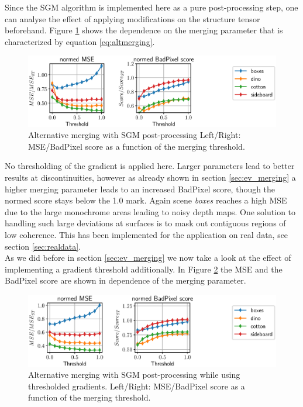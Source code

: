 \documentclass  [
  paper    = a4,
  BCOR     = 10mm,
  twoside,
  fontsize = 12pt,
  fleqn,
  toc      = bibnumbered,
  toc      = listofnumbered,
  numbers  = noendperiod,
  headings = normal,
  listof   = leveldown,
  version  = 3.03
]                                       {scrreprt}
\begin{document}
Since the SGM algorithm is implemented here as a pure post-processing step, one can analyse the effect of applying modifications on the structure tensor beforehand. Figure \ref{fig:chooselowersgmppr} shows the dependence on the merging parameter that is characterized by equation \ref{eq:altmerging}. 
\begin{figure}[h!]
	\centering
	\includegraphics[width=1\linewidth]{images/choose_lower_sgm_ppr}
	\caption[Alternative merging with SGM post-processing]{Alternative merging with SGM post-processing Left/Right: MSE/BadPixel score as a function of the merging threshold.}
	\label{fig:chooselowersgmppr}
\end{figure}
No thresholding of the gradient is applied here. Larger parameters lead to better results at discontinuities, however as already shown in section \ref{sec:ev_merging} a higher merging parameter leads to an increased BadPixel score, though the normed score stays below the 1.0 mark. Again scene \textit{boxes} reaches a high MSE due to the large monochrome areas leading to noisy depth maps. One solution to handling such large deviations at surfaces is to mask out contiguous regions of low coherence. This has been implemented for the application on real data, see section \ref{sec:realdata}.\\
As we did before in section \ref{sec:ev_merging} we now take a look at the effect of implementing a gradient threshold additionally. In Figure \ref{fig:chooselowersgmpprthresh} the MSE and the BadPixel score are shown in dependence of the merging parameter.
\begin{figure}[h!]
	\centering
	\includegraphics[width=1\linewidth]{images/choose_lower_sgm_ppr_thresh}
	\caption[Alternative merging with SGM post-processing with thresholded gradients]{Alternative merging with SGM post-processing while using thresholded gradients. Left/Right: MSE/BadPixel score as a function of the merging threshold.}
	\label{fig:chooselowersgmpprthresh}
\end{figure}
\end{document}
